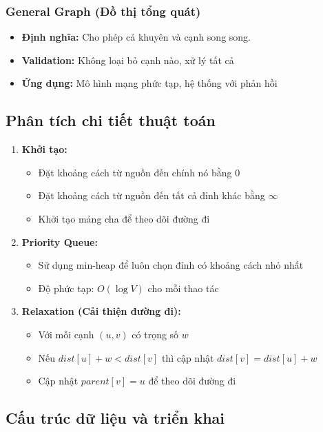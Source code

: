 \documentclass[12pt]{article}
\begin{document}
\subsubsection*{General Graph (Đồ thị tổng quát)}
\begin{itemize}
    \item \textbf{Định nghĩa:} Cho phép cả khuyên và cạnh song song.
    \item \textbf{Validation:} Không loại bỏ cạnh nào, xử lý tất cả
    \item \textbf{Ứng dụng:} Mô hình mạng phức tạp, hệ thống với phản hồi
\end{itemize}

\subsection*{Phân tích chi tiết thuật toán}

\begin{enumerate}
    \item \textbf{Khởi tạo:}
    \begin{itemize}
        \item Đặt khoảng cách từ nguồn đến chính nó bằng 0
        \item Đặt khoảng cách từ nguồn đến tất cả đỉnh khác bằng $\infty$
        \item Khởi tạo mảng cha để theo dõi đường đi
    \end{itemize}
    
    \item \textbf{Priority Queue:}
    \begin{itemize}
        \item Sử dụng min-heap để luôn chọn đỉnh có khoảng cách nhỏ nhất
        \item Độ phức tạp: $O(\log V)$ cho mỗi thao tác
    \end{itemize}
    
    \item \textbf{Relaxation (Cải thiện đường đi):}
    \begin{itemize}
        \item Với mỗi cạnh $(u,v)$ có trọng số $w$
        \item Nếu $dist[u] + w < dist[v]$ thì cập nhật $dist[v] = dist[u] + w$
        \item Cập nhật $parent[v] = u$ để theo dõi đường đi
    \end{itemize}
\end{enumerate}

\subsection*{Cấu trúc dữ liệu và triển khai}
\end{document}
